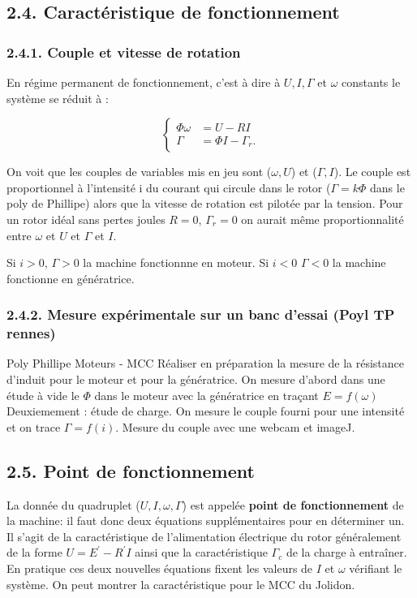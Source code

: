 \documentclass[french, a4paper, 10pt, twocolumn, landscape]{article}
\begin{document}
\subsection*{2.4. Caractéristique de fonctionnement}

\subsubsection*{2.4.1. Couple et vitesse de rotation}

En régime permanent de fonctionnement, c'est à dire à $U, I, \Gamma$ et $\omega$ constants le système se réduit à : 

\begin{equation}
	\left\{
		\begin{array}{cc}
		\Phi\omega & = U-RI\\
		\Gamma & = \Phi I-\Gamma_r.
	\end{array}
	\right.
\end{equation}


On voit que les couples de variables mis en jeu sont ($\omega, U$) et ($\Gamma, I$). Le couple est proportionnel à l’intensité i du courant qui circule dans le rotor ($\Gamma = k\Phi$ dans le poly de Phillipe) alors que la vitesse de rotation est pilotée par la tension. Pour un rotor idéal sans pertes joules $R=0$, $\Gamma_r=0$ on aurait même proportionnalité entre $\omega$ et $U$ et $\Gamma$ et $I$.\medskip


Si $i>0$, $\Gamma>0$ la machine fonctionnne en moteur. Si $i<0$ $\Gamma<0$ la machine fonctionne en génératrice.

\subsubsection*{2.4.2. Mesure expérimentale sur un banc d'essai (Poyl TP rennes)}
Poly Phillipe Moteurs - MCC
Réaliser en préparation la mesure de la résistance d'induit pour le moteur et pour la génératrice. On mesure d'abord dans une étude à vide le $\Phi$ dans le moteur avec la génératrice en traçant $E=f(\omega)$
Deuxiemement : étude de charge. On mesure le couple fourni pour une intensité et on trace $\Gamma=f(i)$. Mesure du couple avec une webcam et imageJ. 


\subsection*{2.5. Point de fonctionnement}

La donnée du quadruplet ($U,I, \omega, \Gamma$) est appelée \textbf{point de fonctionnement}  de la machine: il faut donc deux équations supplémentaires pour en déterminer un. Il s'agit de la caractéristique de l'alimentation électrique du rotor généralement de la forme $U = E^\prime-R^\prime I$ ainsi que la caractéristique $\Gamma_c$ de la charge à entraîner. En pratique ces deux nouvelles équations fixent les valeurs de $I$ et $\omega$ vérifiant le système. On peut montrer la caractéristique pour le MCC du Jolidon.
\end{document}
